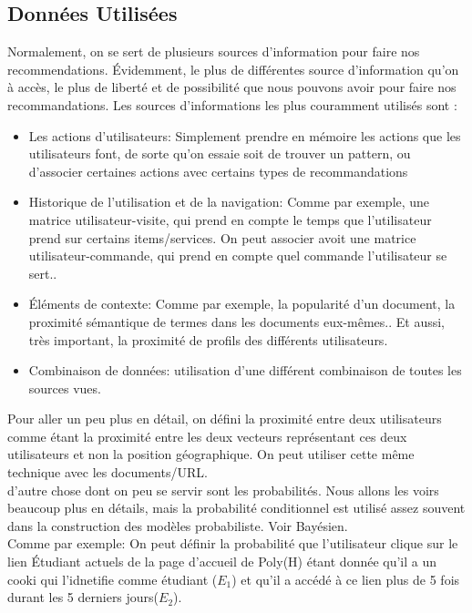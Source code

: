 \documentclass[oneside]{book}
\begin{document}
\subsection{Données Utilisées}
Normalement, on se sert de plusieurs sources d'information pour faire nos recommendations. Évidemment, le plus de différentes source d'information qu'on à accès, le plus de liberté et de possibilité que nous pouvons avoir pour faire nos recommandations. Les sources d'informations les plus couramment utilisés sont :
\begin{itemize}
\item Les actions d'utilisateurs:  Simplement prendre en mémoire les actions que les utilisateurs font, de sorte qu'on essaie soit de trouver un pattern, ou d'associer certaines actions avec certains types de recommandations
\item Historique de l'utilisation et de la navigation: Comme par exemple, une matrice utilisateur-visite, qui prend en compte le temps que l'utilisateur prend sur certains items/services. On peut associer avoit une matrice utilisateur-commande, qui prend en compte quel commande l'utilisateur se sert.. 
\item Éléments de contexte: Comme par exemple, la popularité d'un document, la proximité sémantique de termes dans les documents eux-mêmes.. Et aussi, très important, la proximité de profils des différents utilisateurs.
\item Combinaison de données:  utilisation d'une différent combinaison de toutes les sources vues.
\end{itemize}

Pour aller un peu plus en détail, on défini la proximité entre deux utilisateurs comme étant la proximité entre les deux vecteurs représentant ces deux utilisateurs et non la position géographique. On peut utiliser cette même technique avec les documents/URL.\\

d'autre chose dont on peu se servir sont les probabilités. Nous allons les voirs beaucoup plus en détails, mais la probabilité conditionnel est utilisé assez souvent dans la construction des modèles probabiliste. Voir Bayésien.\\

Comme par exemple: On peut définir la probabilité que l'utilisateur clique sur le lien Étudiant actuels de la page d'accueil de Poly(H) étant donnée qu'il a un cooki qui l'idnetifie comme étudiant ($E_1$) et qu'il a accédé à ce lien plus de 5 fois durant les 5 derniers jours($E_2$). \\
\end{document}

